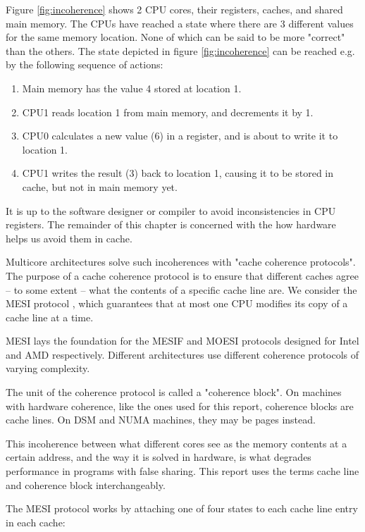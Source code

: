 Figure \ref{fig:incoherence} shows 2 CPU cores, their registers, caches, and
shared main memory. The CPUs have reached a state where there are 3 different
values for the same memory location. None of which can be said to be more
"correct" than the others.
The state depicted in figure \ref{fig:incoherence} can be reached e.g. by the
following sequence of actions:

\begin{enumerate}
	\item Main memory has the value 4 stored at location 1.
	\item CPU1 reads location 1 from main memory, and decrements it by 1.
	\item CPU0 calculates a new value (6) in a register, and is about to
		write it to location 1.
	\item CPU1 writes the result (3) back to location 1, causing it to be
		stored in cache, but not in main memory yet.
\end{enumerate}

It is up to the software designer or compiler to avoid inconsistencies in CPU
registers. The remainder of this chapter is concerned with the how hardware
helps us avoid them in cache.

Multicore architectures solve such incoherences with "cache coherence
protocols". The purpose of a cache coherence protocol is to ensure that different
caches agree -- to some extent -- what the contents of a specific cache line
are. We consider the MESI protocol \cite{mesi,mckenny-barriers}, which
guarantees that at most one CPU modifies its copy of a cache line at a
time.

MESI lays the foundation for the MESIF and MOESI protocols designed for Intel
and AMD respectively. Different architectures use different coherence protocols
of varying complexity.

The unit of the coherence protocol is called a "coherence block". On machines
with hardware coherence, like the ones used for this report, coherence blocks
are cache lines. On DSM and NUMA machines, they may be pages
instead\cite{falsedef}.

This incoherence between what different cores see as the memory contents at a
certain address, and the way it is solved in hardware, is what degrades
performance in programs with false sharing. This report uses the terms cache
line and coherence block interchangeably.

The MESI protocol works by attaching one of four states to each cache line
entry in each cache:

